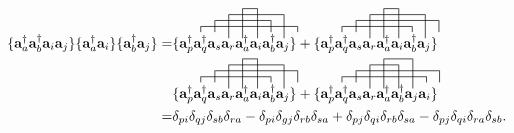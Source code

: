 \documentclass[a4paper,norsk,11pt,twoside]{report}
\begin{document}
\begin{align}
\{\textbf{a}^{\dag}_a \textbf{a}^{\dag}_b \textbf{a}_i \textbf{a}_j \}
\{\textbf{a}^{\dag}_a \textbf{a}_i \}
\{\textbf{a}^{\dag}_b \textbf{a}_j \}
 = &
\{
\contraction{}{\textbf{a}^{\dag}_p}{\textbf{a}^{\dag}_q 
\textbf{a}_s \textbf{a}_r
\textbf{a}^{\dag}_a \textbf{a}_i
\textbf{a}^{\dag}_b}{\textbf{a}_j}
\contraction[2ex]{\textbf{a}^{\dag}_p}{\textbf{a}^{\dag}_q}{\textbf{a}_s \textbf{a}_r
\textbf{a}^{\dag}_a}{\textbf{a}_i}
\contraction[4ex]{\textbf{a}^{\dag}_p \textbf{a}^{\dag}_q}{\textbf{a}_s}{\textbf{a}_r
\textbf{a}^{\dag}_a \textbf{a}_i}{\textbf{a}^{\dag}_b}
\contraction[5ex]{\textbf{a}^{\dag}_p \textbf{a}^{\dag}_q 
\textbf{a}_s}{\textbf{a}_r}{}{\textbf{a}^{\dag}_a}
\textbf{a}^{\dag}_p \textbf{a}^{\dag}_q 
\textbf{a}_s \textbf{a}_r
\textbf{a}^{\dag}_a \textbf{a}_i
\textbf{a}^{\dag}_b \textbf{a}_j 
\}
+ 
\{
\contraction[4ex]{\textbf{a}^{\dag}_p \textbf{a}^{\dag}_q}{\textbf{a}_s}{\textbf{a}_r
\textbf{a}^{\dag}_a \textbf{a}_i}{\textbf{a}^{\dag}_b}
\contraction[5ex]{\textbf{a}^{\dag}_p \textbf{a}^{\dag}_q 
\textbf{a}_s}{\textbf{a}_r}{}{\textbf{a}^{\dag}_a}
\contraction{}{\textbf{a}^{\dag}_p}{\textbf{a}^{\dag}_q 
\textbf{a}_s \textbf{a}_r
\textbf{a}^{\dag}_a}{\textbf{a}_i}
\contraction[2ex]{\textbf{a}^{\dag}_p}{\textbf{a}^{\dag}_q}{\textbf{a}_s \textbf{a}_r
\textbf{a}^{\dag}_a \textbf{a}_i
\textbf{a}^{\dag}_b}{\textbf{a}_j}
\textbf{a}^{\dag}_p \textbf{a}^{\dag}_q 
\textbf{a}_s \textbf{a}_r
\textbf{a}^{\dag}_a \textbf{a}_i
\textbf{a}^{\dag}_b \textbf{a}_j 
\} \nonumber \\ & 
\{
\contraction[4ex]{\textbf{a}^{\dag}_p \textbf{a}^{\dag}_q}{\textbf{a}_s}{\textbf{a}_r
\textbf{a}^{\dag}_a \textbf{a}_i}{\textbf{a}^{\dag}_b}
\contraction[5ex]{\textbf{a}^{\dag}_p \textbf{a}^{\dag}_q 
\textbf{a}_s}{\textbf{a}_r}{}{\textbf{a}^{\dag}_a}
\contraction{}{\textbf{a}^{\dag}_p}{\textbf{a}^{\dag}_q 
\textbf{a}_s \textbf{a}_r
\textbf{a}^{\dag}_a}{\textbf{a}_i}
\contraction[2ex]{\textbf{a}^{\dag}_p}{\textbf{a}^{\dag}_q}{\textbf{a}_s \textbf{a}_r
\textbf{a}^{\dag}_a \textbf{a}_i
\textbf{a}^{\dag}_b}{\textbf{a}_j}
\textbf{a}^{\dag}_p \textbf{a}^{\dag}_q 
\textbf{a}_s \textbf{a}_r
\textbf{a}^{\dag}_a \textbf{a}_i
\textbf{a}^{\dag}_b \textbf{a}_j 
\}
+
\{
\contraction[4ex]{\textbf{a}^{\dag}_p \textbf{a}^{\dag}_q}{\textbf{a}_s}{\textbf{a}_r}{\textbf{a}^{\dag}_a}
\contraction[5ex]{\textbf{a}^{\dag}_p \textbf{a}^{\dag}_q 
\textbf{a}_s}{\textbf{a}_r}{\textbf{a}^{\dag}_a}{\textbf{a}^{\dag}_b}
\contraction[2ex]{\textbf{a}^{\dag}_p}{\textbf{a}^{\dag}_q}{\textbf{a}_s \textbf{a}_r
\textbf{a}^{\dag}_a \textbf{a}^{\dag}_b\textbf{a}_j}{\textbf{a}_i}
\contraction{}{\textbf{a}^{\dag}_p}{\textbf{a}^{\dag}_q 
\textbf{a}_s \textbf{a}_r \textbf{a}^{\dag}_a \textbf{a}^{\dag}_b}{\textbf{a}_j}
\textbf{a}^{\dag}_p \textbf{a}^{\dag}_q 
\textbf{a}_s \textbf{a}_r
\textbf{a}^{\dag}_a \textbf{a}^{\dag}_b
\textbf{a}_j \textbf{a}_i
\} \nonumber \\
 = & \delta_{pi} \delta_{qj} \delta_{sb} \delta_{ra} 
- \delta_{pi} \delta_{gj} \delta_{rb} \delta_{sa}
+ \delta_{pj} \delta_{qi} \delta_{rb} \delta_{sa}
- \delta_{pj} \delta_{qi} \delta_{ra} \delta_{sb} .
\end{align}
\end{document}
